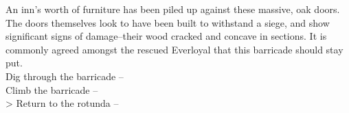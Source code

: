 An inn’s worth of furniture has been piled up against these massive, oak doors. The doors themselves look to have been built to withstand a siege, and show significant signs of damage--their wood cracked and concave in sections. It is commonly agreed amongst the rescued Everloyal that this barricade should stay put.\\

 Dig through the barricade -- \\
 Climb the barricade -- \\
> Return to the rotunda -- 